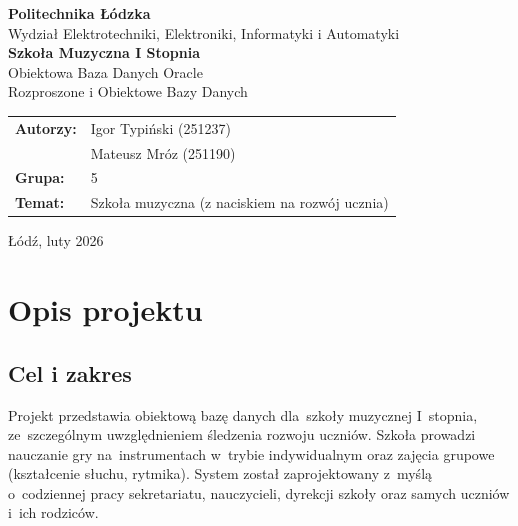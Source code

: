 \documentclass[12pt,a4paper]{article}
\begin{document}
\begin{titlepage}
    \centering
    \vspace*{1cm}

    \Large\textbf{Politechnika Łódzka}\\[0.3cm]
    {\large Wydział Elektrotechniki, Elektroniki, Informatyki i Automatyki}\\[2cm]

    {\Huge\textbf{Szkoła Muzyczna I Stopnia}}\\[0.5cm]
    {\Large Obiektowa Baza Danych Oracle}\\[1cm]

    {\large Rozproszone i Obiektowe Bazy Danych}\\[3cm]

    \begin{tabular}{ll}
        \textbf{Autorzy:} & Igor Typiński (251237) \\
                          & Mateusz Mróz (251190) \\[0.5cm]
        \textbf{Grupa:}   & 5 \\[0.5cm]
        \textbf{Temat:}   & Szkoła muzyczna (z naciskiem na rozwój ucznia)
    \end{tabular}

    \vfill
    {\large Łódź, luty 2026}
\end{titlepage}

\tableofcontents
\newpage

\section{Opis projektu}

\subsection{Cel i zakres}

Projekt przedstawia obiektową bazę danych dla~szkoły muzycznej I~stopnia, ze~szczególnym uwzględnieniem śledzenia rozwoju uczniów. Szkoła prowadzi nauczanie gry na~instrumentach w~trybie indywidualnym oraz zajęcia grupowe (kształcenie słuchu, rytmika). System został zaprojektowany z~myślą o~codziennej pracy sekretariatu, nauczycieli, dyrekcji szkoły oraz samych uczniów i~ich rodziców.
\end{document}
